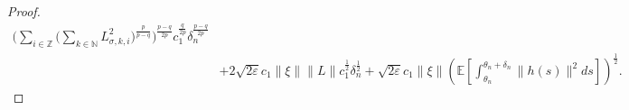 \documentclass[11pt]{article}
\numberwithin{equation}{section}
\theoremstyle{plain}
\begin{document}
\begin{proof}
\begin{align}
                   \bigg( \sum_{i \in \mathbb{Z} }
                                    \Big( \sum_{k \in \mathbb{N} } L_{\sigma, k, i}^2
                                    \Big)^{\frac{p}{p-q} }
                   \bigg)^\frac{p-q}{2p} 
                   c_1^{\frac{q}{2p} } 
                   \delta_n^{\frac{p-q}{2p} }  \nonumber\\                        
       & + 2 \sqrt{2\varepsilon} c_1  \| \xi \| \|L\|
                 c_1^{\frac{1}{2} } 
                           \delta_n^{\frac{1}{2} }  
           + \sqrt{2\varepsilon} c_1  \| \xi \|
                    \left( \mathbb{E} 
                                    \left[ \int_{\theta_n}^{\theta_n + \delta_n} 
                                                      \| h(s) \|^2
                                               ds
                                    \right]
                    \right)^{\frac{1}{2} }.                           
 \end{align} 
 

\end{proof}
\end{document}
